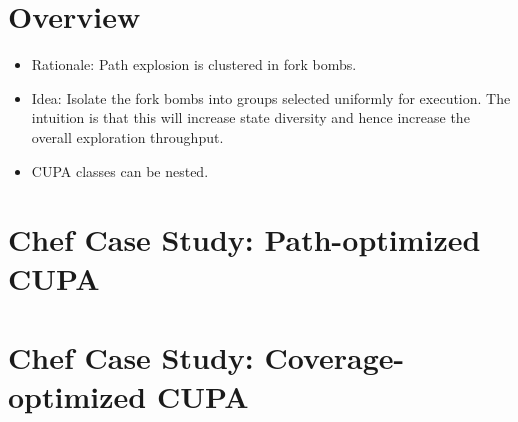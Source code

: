 \section{Overview}

\begin{itemize}
\item Rationale: Path explosion is clustered in fork bombs.
\item Idea: Isolate the fork bombs into groups selected uniformly for execution.  The intuition is that this will increase state diversity and hence increase the overall exploration throughput.
\item CUPA classes can be nested.
\end{itemize}


\section{Chef Case Study: Path-optimized CUPA}


\section{Chef Case Study: Coverage-optimized CUPA}

